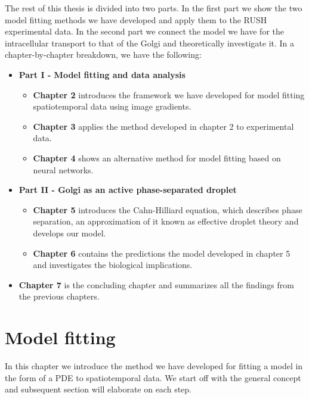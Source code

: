\documentclass{Dissertate}
\providecommand{\tightlist}{%
  \setlength{\itemsep}{0pt}\setlength{\parskip}{0pt}}
\begin{document}
The rest of this thesis is divided into two parts. In the first part we
show the two model fitting methods we have developed and apply them to
the RUSH experimental data. In the second part we connect the model we have for the intracellular transport to that of the Golgi and theoretically investigate it. In a chapter-by-chapter breakdown, we have the
following:

\begin{itemize}
\tightlist
\item
  \textbf{Part I - Model fitting and data analysis}

  \begin{itemize}
  \tightlist
  \item
    \textbf{Chapter 2} introduces the framework we have developed for
    model fitting spatiotemporal data using image gradients.
  \item
    \textbf{Chapter 3} applies the method developed in chapter 2 to
    experimental data.
  \item
    \textbf{Chapter 4} shows an alternative method for model fitting
    based on neural networks.
  \end{itemize}
\item
  \textbf{Part II - Golgi as an active phase-separated droplet }

  \begin{itemize}
  \tightlist
  \item
    \textbf{Chapter 5} introduces the Cahn-Hilliard equation, which
    describes phase separation, an approximation of it known as
    effective droplet theory and develops our model.
  \item
    \textbf{Chapter 6} contains the predictions the model developed in
    chapter 5 and investigates the biological implications.
  \end{itemize}
\item
  \textbf{Chapter 7} is the concluding chapter and summarizes all the
  findings from the previous chapters.
\end{itemize}

\hypertarget{model-fitting}{%
\chapter{Model fitting}\label{model-fitting}}

In this chapter we introduce the method we have developed for fitting a
model in the form of a PDE to spatiotemporal data. We start off with the general concept and subsequent section will elaborate on each step.
\end{document}
